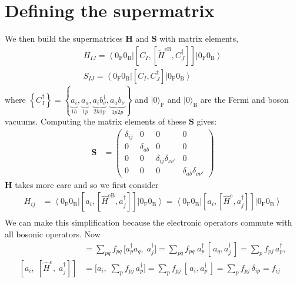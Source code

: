 \section{Defining the supermatrix}
We then build the supermatrices $\mathbf{H}$ and $\mathbf{S}$ with matrix elements,
$$
\begin{gathered}
H_{I J}=\left\langle 0_{\mathrm{F}} 0_{\mathrm{B}}\right|\left[C_I,\left[\tilde{H}^{\mathrm{eB}}, C_J^{\dagger}\right]\right]\left|0_{\mathrm{F}} 0_{\mathrm{B}}\right\rangle \\
S_{I J}=\left\langle 0_{\mathrm{F}} 0_{\mathrm{B}}\right|\left[C_I, C_J^{\dagger}\right]\left|0_{\mathrm{F}} 0_{\mathrm{B}}\right\rangle
\end{gathered}
$$
where $\left\{C_I^{\dagger}\right\}=\left\{\underbrace{a_i}_{1h}, \underbrace{a_a}_{1p}, \underbrace{a_i b_\nu^{\dagger}}_{2h1p}, \underbrace{a_a b_\nu}_{1p2p}\right\}$ and $|0\rangle_{\mathrm{F}}$ and $|0\rangle_{\mathrm{B}}$ are the Fermi and boson vacuums. Computing the matrix elements of these $\bm{S}$ gives:
\begin{align}
\bm{S} &= \begin{pmatrix}
    \delta_{ij} & 0 & 0 & 0 \\
    0 & \delta_{ab} & 0 & 0 \\
    0 & 0 & \delta_{ij}\delta_{\nu\nu'} & 0 \\
    0 & 0 & 0 & \delta_{ab}\delta_{\nu\nu'}
\end{pmatrix}
\end{align}
$\bm{H}$ takes more care and so we first consider
\begin{equation}
\begin{split}
    H_{ij} &= \left\langle 0_{\mathrm{F}} 0_{\mathrm{B}}\right|\left[a_i, \left[\hat{H}^{\mathrm{eB}}, a_j^{\dagger}\right]\right]\left|0_{\mathrm{F}} 0_{\mathrm{B}}\right\rangle = \left\langle 0_{\mathrm{F}} 0_{\mathrm{B}}\right|\left[a_i, \left[\hat{H}^{\mathrm{e}}, a_j^{\dagger}\right]\right]\left|0_{\mathrm{F}} 0_{\mathrm{B}}\right\rangle \\
\end{split}
\end{equation}
We can make this simplification because the electronic operators commute with all bosonic operators. Now
\begin{align}
[\hat H^e,\;a_j^\dagger]
&= \sum_{p q}f_{pq}\,\bigl[a_p^\dagger a_q,\;a_j^\dagger\bigr]
= \sum_{p q}f_{pq}\;a_p^\dagger\,[\,a_q,a_j^\dagger\,]
= \sum_{p}f_{p j}\,a_p^\dagger,\\[6pt]
[a_i,\;[\hat H^e,\;a_j^\dagger]]
&= \bigl[a_i,\;\sum_{p}f_{p j}\,a_p^\dagger\bigr]
= \sum_{p}f_{p j}\,[\,a_i,a_p^\dagger\,]
= \sum_{p}f_{p j}\,\delta_{i p}
= f_{i j}
\end{align}

